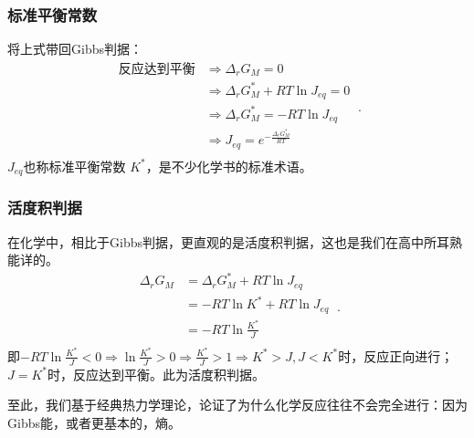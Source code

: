 \subsubsection{标准平衡常数}
将上式带回Gibbs判据：
\begin{equation}
\begin{aligned}
\text{反应达到平衡} &\Rightarrow \Delta_r G_M = 0\\
&\Rightarrow \Delta_r G_M^* + RT \ln J_{eq} = 0\\
&\Rightarrow \Delta_r G_M^* = - RT \ln J_{eq}\\
&\Rightarrow J_{eq} = e^{-\frac{\Delta_r G_M^*}{RT}}\\
\end{aligned}~.
\end{equation}
$J_{eq}$也称标准平衡常数 $K^*$，是不少化学书的标准术语。

\subsubsection{活度积判据}
在化学中，相比于Gibbs判据，更直观的是活度积判据，这也是我们在高中所耳熟能详的。
$$
\begin{aligned}
\Delta_r G_M & = \Delta_r G_M^* + RT \ln J_{eq}\\
& = - RT \ln K^* + RT \ln J_{eq}\\
& = - RT \ln \frac{K^*}{J} \\
\end{aligned}~.
$$
即$- RT \ln \frac{K^*}{J}<0 \Rightarrow \ln \frac{K^*}{J} >0 \Rightarrow \frac{K^*}{J} >1 \Rightarrow K^*>J, J<K^*$时，反应正向进行；$J=K^*$时，反应达到平衡。此为活度积判据。

至此，我们基于经典热力学理论，论证了为什么化学反应往往不会完全进行：因为Gibbs能，或者更基本的，熵。





